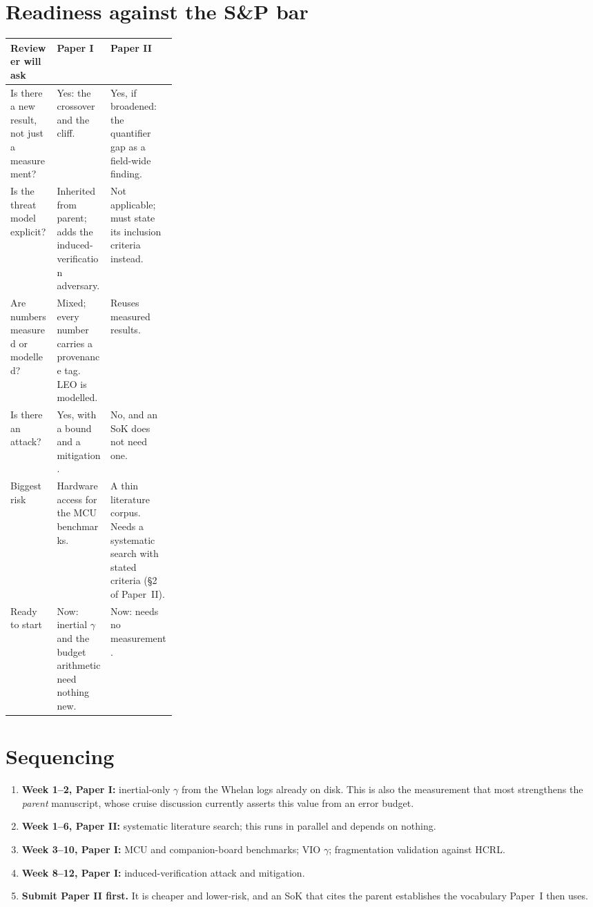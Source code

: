 \documentclass[11pt,a4paper]{article}
\begin{document}
\section{Readiness against the S\&P bar}
\begin{center}\small
\begin{tabularx}{\linewidth}{@{}P{0.28\linewidth}YY@{}}
\toprule
\textbf{Reviewer will ask} & \textbf{Paper I} & \textbf{Paper II} \\
\midrule
Is there a new result, not just a measurement? & Yes: the crossover and the
cliff. & Yes, if broadened: the quantifier gap as a field-wide finding. \\
Is the threat model explicit? & Inherited from parent; adds the
induced-verification adversary. & Not applicable; must state its inclusion
criteria instead. \\
Are numbers measured or modelled? & Mixed; every number carries a provenance
tag. LEO is modelled. & Reuses measured results. \\
Is there an attack? & Yes, with a bound and a mitigation. & No, and an SoK
does not need one. \\
Biggest risk & Hardware access for the MCU benchmarks. & A thin literature
corpus. Needs a systematic search with stated criteria (\S2 of Paper~II). \\
Ready to start & Now: inertial $\gamma$ and the budget arithmetic need nothing
new. & Now: needs no measurement. \\
\bottomrule
\end{tabularx}
\end{center}

\section{Sequencing}
\begin{enumerate}
\item \textbf{Week 1--2, Paper I:} inertial-only $\gamma$ from the Whelan logs
  already on disk. This is also the measurement that most strengthens the
  \emph{parent} manuscript, whose cruise discussion currently asserts this
  value from an error budget.
\item \textbf{Week 1--6, Paper II:} systematic literature search; this runs
  in parallel and depends on nothing.
\item \textbf{Week 3--10, Paper I:} MCU and companion-board benchmarks; VIO
  $\gamma$; fragmentation validation against HCRL.
\item \textbf{Week 8--12, Paper I:} induced-verification attack and mitigation.
\item \textbf{Submit Paper II first.} It is cheaper and lower-risk, and an SoK
  that cites the parent establishes the vocabulary Paper~I then uses.
\end{enumerate}
\end{document}
